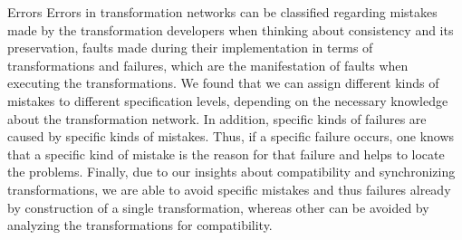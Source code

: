 \begin{insight}{Errors}
    Errors in transformation networks can be classified regarding mistakes made by the transformation developers when thinking about consistency and its preservation, faults made during their implementation in terms of transformations and failures, which are the manifestation of faults when executing the transformations.
    We found that we can assign different kinds of mistakes to different specification levels, depending on the necessary knowledge about the transformation network.
    In addition, specific kinds of failures are caused by specific kinds of mistakes.
    Thus, if a specific failure occurs, one knows that a specific kind of mistake is the reason for that failure and helps to locate the problems.
    Finally, due to our insights about compatibility and synchronizing transformations, we are able to avoid specific mistakes and thus failures already by construction of a single transformation, whereas other can be avoided by analyzing the transformations for compatibility.
\end{insight}